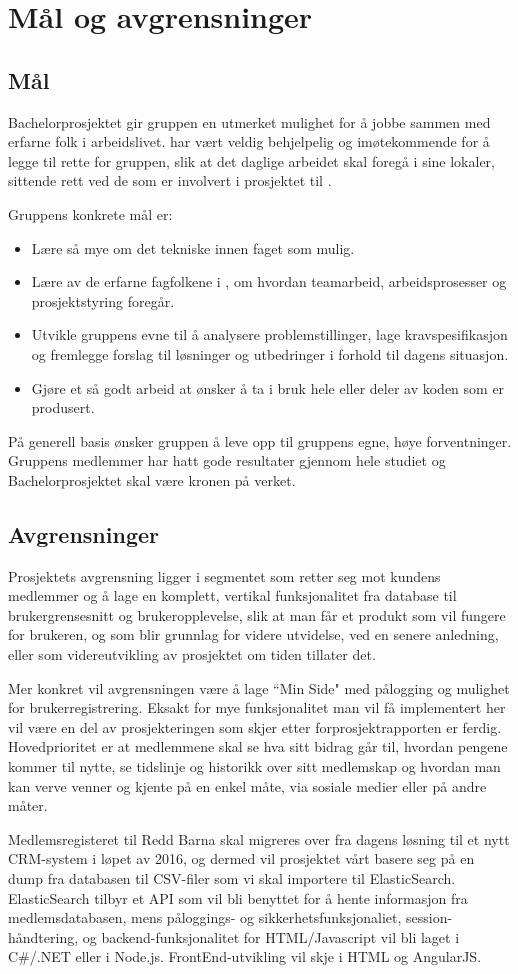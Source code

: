 \chapter{Mål og avgrensninger}
\section{Mål}
Bachelorprosjektet gir gruppen en utmerket mulighet for å jobbe sammen med erfarne folk i arbeidslivet. \mw{} har vært veldig behjelpelig og imøtekommende for å legge til rette for gruppen, slik at det daglige arbeidet skal foregå i \mw{} sine lokaler, sittende rett ved de som er involvert i prosjektet til \rb{}.

Gruppens konkrete mål er:
\begin{itemize}
\item Lære så mye om det tekniske innen faget som mulig.
\item Lære av de erfarne fagfolkene i \mw{}, om hvordan teamarbeid, arbeidsprosesser og prosjektstyring foregår.
\item Utvikle gruppens evne til å analysere problemstillinger, lage kravspesifikasjon og fremlegge forslag til løsninger og utbedringer i forhold til dagens situasjon.
\item Gjøre et så godt arbeid at \mw{} ønsker å ta i bruk hele eller deler av koden som er produsert.
\end{itemize}

På generell basis ønsker gruppen å leve opp til gruppens egne, høye forventninger. Gruppens medlemmer har hatt gode resultater gjennom hele studiet og Bachelorprosjektet skal være kronen på verket.

\section{Avgrensninger}
Prosjektets avgrensning ligger i segmentet som retter seg mot kundens medlemmer og å lage en komplett, vertikal funksjonalitet fra database til brukergrensesnitt og brukeropplevelse, slik at man får et produkt som vil fungere for brukeren, og som blir grunnlag for videre utvidelse, ved en senere anledning, eller som videreutvikling av prosjektet om tiden tillater det.

Mer konkret vil avgrensningen være å lage ``Min Side" med pålogging og mulighet for brukerregistrering. Eksakt for mye funksjonalitet man vil få implementert her vil være en del av prosjekteringen som skjer etter forprosjektrapporten er ferdig. Hovedprioritet er at medlemmene skal se hva sitt bidrag går til, hvordan pengene kommer til nytte, se tidslinje og historikk over sitt medlemskap og hvordan man kan verve venner og kjente på en enkel måte, via sosiale medier eller på andre måter.

Medlemsregisteret til Redd Barna skal migreres over fra dagens løsning til et nytt CRM-system i løpet av 2016, og dermed vil prosjektet vårt basere seg på en dump fra databasen til CSV-filer som vi skal importere til ElasticSearch. ElasticSearch tilbyr et API som vil bli benyttet for å hente informasjon fra medlemsdatabasen, mens påloggings- og sikkerhetsfunksjonaliet, session-håndtering, og backend-funksjonalitet for HTML/Javascript vil bli laget i C\#/.NET eller i Node.js. FrontEnd-utvikling vil skje i HTML og AngularJS.